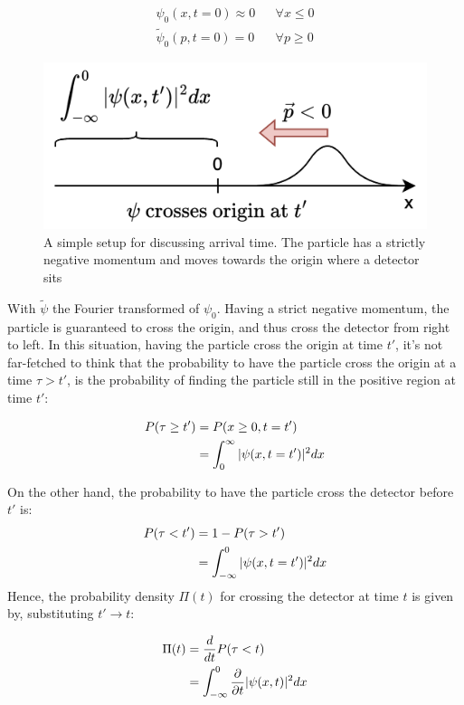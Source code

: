\begin{align}
    \psi_0(x, t=0) \approx 0 && \forall x \leq 0\\
    \tilde{\psi}_0(p, t=0) = 0 && \forall p \geq 0
\end{align}

\begin{figure}
    \centering
    \includegraphics[width=1\linewidth]{Figures/ideal_situation.png}
    \caption{A simple setup for discussing arrival time. The particle has a strictly negative momentum and moves towards the origin where a detector sits}
    \label{fig:ideal_situation}
\end{figure}

With $\tilde{\psi}$ the Fourier transformed of $\psi_0$. Having a strict negative momentum, the particle is guaranteed to cross the origin, and thus cross the detector from right to left. In this situation, having the particle cross the origin at time $t'$, it's not far-fetched to think that the probability to have the particle cross the origin at a time $\tau > t'$, is the probability of finding the particle still in the positive region at time $t'$:

\begin{align}
    P(\tau \geq t') &= P(x \geq 0, t=t') \\
    &= \int_0^{\infty} |\psi(x, t=t')|^2 \space dx
\end{align}

On the other hand, the probability to have the particle cross the detector before $t'$ is:
\begin{align}
    P(\tau < t') &= 1- P(\tau > t')\\
    &= \int^0_{-\infty} |\psi(x, t=t')|^2 \space dx
\end{align}
Hence, the probability density $\Pi(t)$ for crossing the detector at time $t$ is given by, substituting $t' \rightarrow t$:

\begin{align}
    \label{eq:init}
    \Pi(t) &= \frac{d}{dt} P(\tau < t) \\
    &= \int^0_{-\infty} \frac{\partial}{\partial t} \space |\psi(x,t)|^2 \space dx
\end{align}

